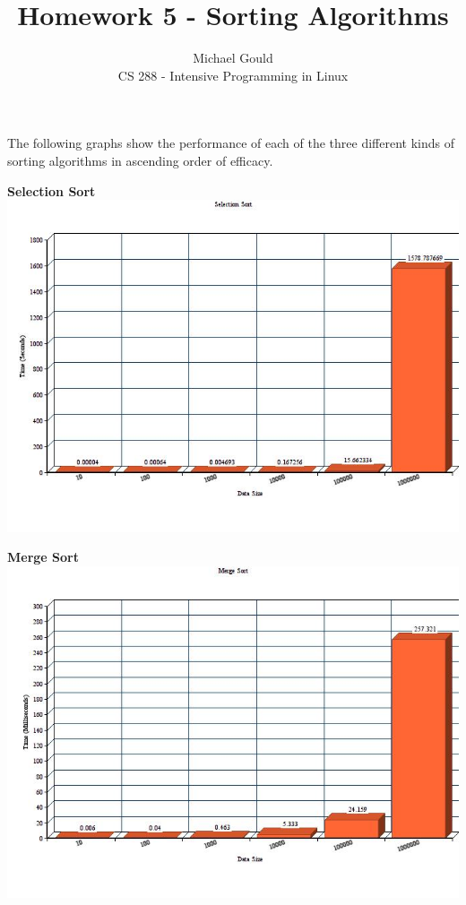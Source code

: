 \documentclass[10pt]{article}
\begin{document}
\title{Homework 5 - Sorting Algorithms}
\author{Michael Gould\\ 
CS 288 - Intensive Programming in Linux}

\maketitle

The following graphs show the performance of each of the three different kinds of sorting algorithms in ascending order of efficacy.

\center
\huge
\textbf{Selection Sort}
\includegraphics[scale=0.6]{Select.jpg}

\textbf{Merge Sort}
\includegraphics[scale=0.6]{Merge.jpg}
\end{document}
